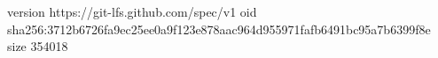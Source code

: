 version https://git-lfs.github.com/spec/v1
oid sha256:3712b6726fa9ec25ee0a9f123e878aac964d955971fafb6491bc95a7b6399f8e
size 354018
